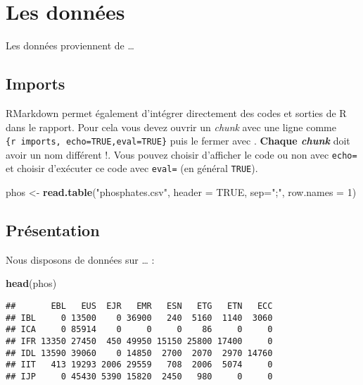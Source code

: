 \documentclass[
]{article}
\newenvironment{Shaded}{\begin{snugshade}}{\end{snugshade}}
\newcommand{\AttributeTok}[1]{\textcolor[rgb]{0.13,0.29,0.53}{#1}}
\newcommand{\ConstantTok}[1]{\textcolor[rgb]{0.56,0.35,0.01}{#1}}
\newcommand{\DecValTok}[1]{\textcolor[rgb]{0.00,0.00,0.81}{#1}}
\newcommand{\FunctionTok}[1]{\textcolor[rgb]{0.13,0.29,0.53}{\textbf{#1}}}
\newcommand{\NormalTok}[1]{#1}
\newcommand{\OtherTok}[1]{\textcolor[rgb]{0.56,0.35,0.01}{#1}}
\newcommand{\StringTok}[1]{\textcolor[rgb]{0.31,0.60,0.02}{#1}}
\begin{document}
\section{Les données}\label{les-donnuxe9es}

Les données proviennent de \ldots{}

\subsection{Imports}\label{imports}

RMarkdown permet également d'intégrer directement des codes et sorties
de R dans le rapport. Pour cela vous devez ouvrir un \emph{chunk} avec
une ligne comme
\texttt{\textasciigrave{}\textasciigrave{}\textasciigrave{}\{r\ imports,\ echo=TRUE,eval=TRUE\}}
puis le fermer avec
\texttt{\textasciigrave{}\textasciigrave{}\textasciigrave{}}.
\textbf{Chaque \emph{chunk}} doit avoir un nom différent !. Vous pouvez
choisir d'afficher le code ou non avec \texttt{echo=} et choisir
d'exécuter ce code avec \texttt{eval=} (en général \texttt{TRUE}).

\begin{Shaded}
\begin{Highlighting}[]
\NormalTok{phos }\OtherTok{\textless{}{-}} \FunctionTok{read.table}\NormalTok{(}\StringTok{"phosphates.csv"}\NormalTok{, }\AttributeTok{header =} \ConstantTok{TRUE}\NormalTok{, }\AttributeTok{sep=}\StringTok{";"}\NormalTok{, }\AttributeTok{row.names =} \DecValTok{1}\NormalTok{)}
\end{Highlighting}
\end{Shaded}

\subsection{Présentation}\label{pruxe9sentation}

Nous disposons de données sur \ldots{} :

\begin{Shaded}
\begin{Highlighting}[]
\FunctionTok{head}\NormalTok{(phos)}
\end{Highlighting}
\end{Shaded}

\begin{verbatim}
##       EBL   EUS  EJR   EMR   ESN   ETG   ETN   ECC
## IBL     0 13500    0 36900   240  5160  1140  3060
## ICA     0 85914    0     0     0    86     0     0
## IFR 13350 27450  450 49950 15150 25800 17400     0
## IDL 13590 39060    0 14850  2700  2070  2970 14760
## IIT   413 19293 2006 29559   708  2006  5074     0
## IJP     0 45430 5390 15820  2450   980     0     0
\end{verbatim}
\end{document}
